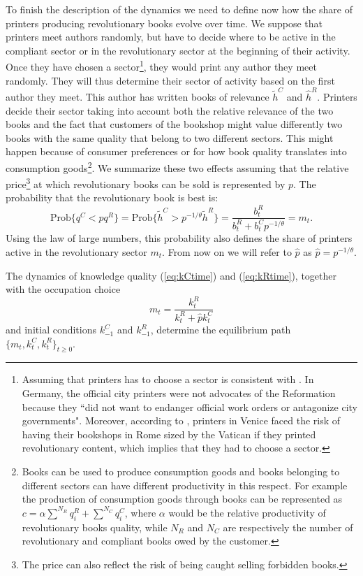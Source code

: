 \documentclass[12pt]{article}
\begin{document}
 To finish the description of the dynamics we need to define now how the  share of  printers  producing revolutionary books evolve over time.
We suppose that printers meet authors randomly, but have to decide where to be active in the compliant sector or in the revolutionary sector at the beginning of their activity. Once they have chosen a sector\footnote{Assuming that printers has to choose a sector is consistent with . In Germany, the official city printers were not advocates of the Reformation because they “did not want to endanger official work orders or antagonize city governments". Moreover, according to \cite{grendler1975}, printers in Venice faced the risk of having their bookshops in Rome sized by the Vatican if they printed revolutionary content, which implies that they had to choose a sector.}, they would print any author they meet randomly. They will thus determine their sector of activity based on the first author they meet. This author has written books of relevance $\tilde{h}^C$ and $\hat{h}^R $. Printers decide their sector taking into account both the relative relevance of the two books and the fact that customers of the bookshop might value differently two books with the same quality that belong to two different sectors. This might happen because of consumer preferences or for how book quality translates into consumption goods\footnote{Books can be used to produce consumption goods and books belonging to different sectors can have different productivity in this respect. For example the production of consumption goods through books can be represented as $c=\alpha\sum^{N_R} q_i^R+\sum^{N_C} q_i^C$, where $\alpha$ would be the relative productivity of revolutionary books quality, while $N_R$ and $N_C$ are respectively the number of revolutionary and compliant books owed by the customer.}. We summarize these two effects assuming that the relative price\footnote{The price can also reflect the risk of being caught selling forbidden books.} at which revolutionary books can be sold is represented by $p$.  The probability that the revolutionary book is best is:
\begin{equation}
\text{Prob}\{q^C<p q^R\}=\text{Prob}\{\tilde{h}^C>p^{-1/\theta}\tilde{h}^R\}=\frac{b^R_t}{b^R_t+b^C_t p^{-1/\theta}}=m_t.
\end{equation}
Using the law of large numbers, this probability also defines  the share of printers active in the  revolutionary sector $m_t$. From now on we will refer to $\hat{p}$ as $\hat{p}=p^{-1/\theta}$.

The dynamics of knowledge quality (\ref{eq:kCtime}) and (\ref{eq:kRtime}),  together with the occupation choice
\begin{equation}\label{eq:sharer}
m_t=\frac{k^R_t}{k^R_t+\hat{p}k^C_t}
\end{equation}
and initial conditions $k_{-1}^C$ and $k_{-1}^R$, determine the equilibrium path $\{ m_t,  k_{t}^C,  k_{t}^R\}_{t\geq 0}$.
\end{document}
